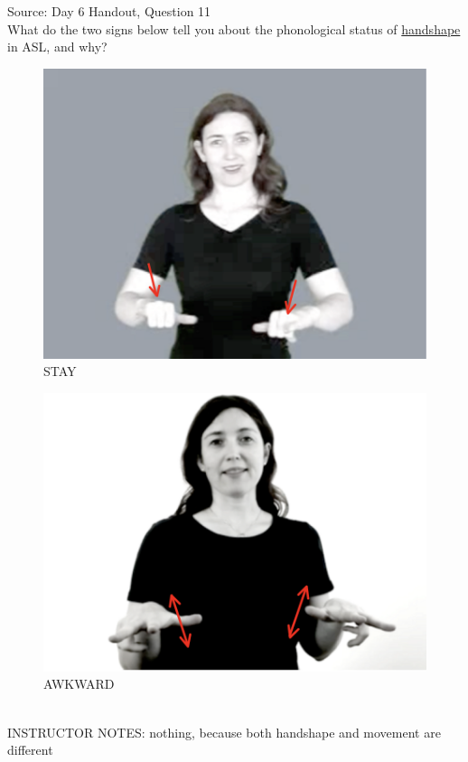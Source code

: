 \documentclass[12pt]{article}
\begin{document}
Source: Day 6 Handout, Question 11\\

What do the two signs below tell you about the phonological status of \underline{handshape} in ASL, and why?\\

\begin{figure}[H]
\includegraphics{../images/asl_stay.png}
\caption{STAY}
\end{figure}
\begin{figure}[H]
\includegraphics{../images/asl_awkward.png}
\caption{AWKWARD}
\end{figure}

~\\
INSTRUCTOR NOTES: nothing, because both handshape and movement are different
\end{document}
